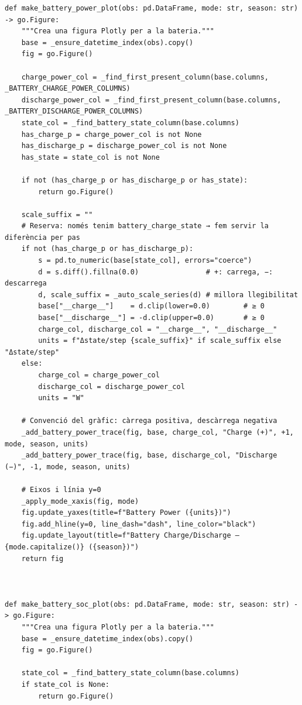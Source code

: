 \documentclass[10pt,a4paper]{article}
\begin{document}
\begin{lstlisting}[style=studioPython,caption={backend/grafics/battery.py},label={lst:backend-grafics-battery-py}]
def make_battery_power_plot(obs: pd.DataFrame, mode: str, season: str) -> go.Figure:
    """Crea una figura Plotly per a la bateria."""
    base = _ensure_datetime_index(obs).copy()
    fig = go.Figure()

    charge_power_col = _find_first_present_column(base.columns, _BATTERY_CHARGE_POWER_COLUMNS)
    discharge_power_col = _find_first_present_column(base.columns, _BATTERY_DISCHARGE_POWER_COLUMNS)
    state_col = _find_battery_state_column(base.columns)
    has_charge_p = charge_power_col is not None
    has_discharge_p = discharge_power_col is not None
    has_state = state_col is not None

    if not (has_charge_p or has_discharge_p or has_state):
        return go.Figure()

    scale_suffix = ""
    # Reserva: només tenim battery_charge_state → fem servir la diferència per pas
    if not (has_charge_p or has_discharge_p):
        s = pd.to_numeric(base[state_col], errors="coerce")
        d = s.diff().fillna(0.0)                # +: carrega, −: descarrega
        d, scale_suffix = _auto_scale_series(d) # millora llegibilitat
        base["__charge__"]    = d.clip(lower=0.0)        # ≥ 0
        base["__discharge__"] = -d.clip(upper=0.0)       # ≥ 0
        charge_col, discharge_col = "__charge__", "__discharge__"
        units = f"Δstate/step {scale_suffix}" if scale_suffix else "Δstate/step"
    else:
        charge_col = charge_power_col
        discharge_col = discharge_power_col
        units = "W"

    # Convenció del gràfic: càrrega positiva, descàrrega negativa
    _add_battery_power_trace(fig, base, charge_col, "Charge (+)", +1, mode, season, units)
    _add_battery_power_trace(fig, base, discharge_col, "Discharge (−)", -1, mode, season, units)

    # Eixos i línia y=0
    _apply_mode_xaxis(fig, mode)
    fig.update_yaxes(title=f"Battery Power ({units})")
    fig.add_hline(y=0, line_dash="dash", line_color="black")
    fig.update_layout(title=f"Battery Charge/Discharge – {mode.capitalize()} ({season})")
    return fig



def make_battery_soc_plot(obs: pd.DataFrame, mode: str, season: str) -> go.Figure:
    """Crea una figura Plotly per a la bateria."""
    base = _ensure_datetime_index(obs).copy()
    fig = go.Figure()

    state_col = _find_battery_state_column(base.columns)
    if state_col is None:
        return go.Figure()


\end{lstlisting}
\end{document}
